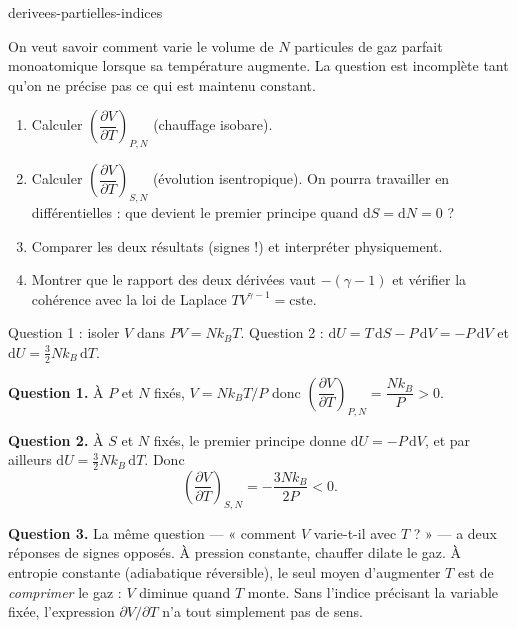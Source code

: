 
\begin{exo}{derivees-partielles-indices}

On veut savoir comment varie le volume de $N$ particules de gaz parfait monoatomique lorsque sa température augmente. La question est incomplète tant qu'on ne précise pas ce qui est maintenu constant.

\begin{enumerate}
\item Calculer $\left(\dfrac{\partial V}{\partial T}\right)_{P,N}$ (chauffage isobare).
\item Calculer $\left(\dfrac{\partial V}{\partial T}\right)_{S,N}$ (évolution isentropique). On pourra travailler en différentielles : que devient le premier principe quand $\mathrm{d}S = \mathrm{d}N = 0$ ?
\item Comparer les deux résultats (signes !) et interpréter physiquement.
\item Montrer que le rapport des deux dérivées vaut $-(\gamma - 1)$ et vérifier la cohérence avec la loi de Laplace $TV^{\gamma-1} = \text{cste}$.
\end{enumerate}

\begin{indication}
Question 1 : isoler $V$ dans $PV = Nk_BT$. Question 2 : $\mathrm{d}U = T\,\mathrm{d}S - P\,\mathrm{d}V = -P\,\mathrm{d}V$ et $\mathrm{d}U = \frac{3}{2}Nk_B\,\mathrm{d}T$.
\end{indication}

\begin{solution}
\textbf{Question 1.} À $P$ et $N$ fixés, $V = Nk_BT/P$ donc $\left(\dfrac{\partial V}{\partial T}\right)_{P,N} = \dfrac{Nk_B}{P} > 0$.

\textbf{Question 2.} À $S$ et $N$ fixés, le premier principe donne $\mathrm{d}U = -P\,\mathrm{d}V$, et par ailleurs $\mathrm{d}U = \tfrac{3}{2}Nk_B\,\mathrm{d}T$. Donc
\[
\left(\frac{\partial V}{\partial T}\right)_{S,N} = -\frac{3Nk_B}{2P} < 0.
\]

\textbf{Question 3.} La même question — « comment $V$ varie-t-il avec $T$ ? » — a deux réponses de signes opposés. À pression constante, chauffer dilate le gaz. À entropie constante (adiabatique réversible), le seul moyen d'augmenter $T$ est de \emph{comprimer} le gaz : $V$ diminue quand $T$ monte. Sans l'indice précisant la variable fixée, l'expression $\partial V/\partial T$ n'a tout simplement pas de sens.


\end{solution}
\end{exo}
